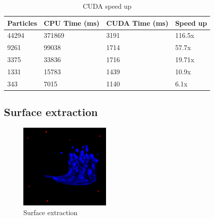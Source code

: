 \documentclass[acmtog]{acmart}
\begin{document}
\begin{table}[h]
	\begin{tabular}{l|l|l|l}
		Particles & CPU Time (ms) & CUDA Time (ms) & Speed up \\ \hline
		44294     & 371869        & 3191           & 116.5x   \\ \hline
		9261      & 99038         & 1714           & 57.7x    \\ \hline
		3375      & 33836         & 1716           & 19.71x   \\ \hline
		1331      & 15783         & 1439           & 10.9x    \\ \hline
		343       & 7015          & 1140           & 6.1x     \\
	\end{tabular}
	\caption{CUDA speed up}
	\label{tab:cuda}
\end{table}

\subsection{Surface extraction}

\begin{figure}[h]
	\centering
	\includegraphics[width=0.40\textwidth]{surface-extraction.png}
	\caption{Surface extraction}
\end{figure}
\end{document}
